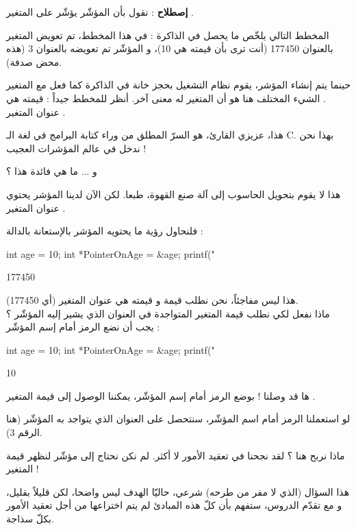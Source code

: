 \textbf{إصطلاح}
: نقول بأن المؤشّر
يؤشّر على المتغير
.

المخطط التالي يلخّص ما يحصل في الذاكرة :
في هذا المخطط، تم تعويض المتغير
بالعنوان 177450 (أنت ترى بأن قيمته هي 10)، و المؤشّر
تم تعويضه بالعنوان 3 (هذه محض صدفة).

حينما يتم إنشاء المؤشر، يقوم نظام التشغيل بحجز خانة في الذاكرة كما فعل مع المتغير
.
الشيء المختلف هنا هو أن المتغير
له معنى آخر. أنظر للمخطط جيداً : قيمته هي عنوان المتغير
.

هذا، عزيزي القارئ، هو السرّ المطلق من وراء كتابة البرامج في لغة الـ
\textenglish{C}.
بهذا نحن ندخل في عالم المؤشرات العجيب !
\begin{question}
	و ... ما هي فائدة هذا ؟
\end{question}
هذا لا يقوم بتحويل الحاسوب إلى آلة صنع القهوة، طبعا. لكن الآن لدينا المؤشر
يحتوي عنوان المتغير
.

فلنحاول رؤية ما يحتويه المؤشر بالإستعانة بالدالة
 :
\begin{Csource}
int age = 10;
int *PointerOnAge = &age;
printf("%
\end{Csource}
\begin{Console}
177450
\end{Console}
هذا ليس مفاجئاً، نحن نطلب قيمة
و قيمته هي عنوان المتغير
(أي 177450).\\
ماذا نفعل لكي نطلب قيمة المتغير المتواجدة في العنوان الذي يشير إليه المؤشّر
؟ يجب أن نضع الرمز
\InlineCode{*}
أمام إسم المؤشّر :
\begin{Csource}
int age = 10;
int *PointerOnAge = &age;
printf("%
\end{Csource}
\begin{Console}
10
\end{Console}
ها قد وصلنا ! بوضع الرمز
\InlineCode{*}
أمام إسم المؤشّر، يمكننا الوصول إلى قيمة المتغير
.

لو استعملنا الرمز
\InlineCode{\&}
أمام اسم المؤشّر، سنتحصل على العنوان الذي يتواجد به المؤشّر (هنا الرقم 3).
\begin{question}
	ماذا نربح هنا ؟ لقد نجحنا في تعقيد الأمور لا أكثر. لم نكن نحتاج إلى مؤشّر لنظهر قيمة المتغير
 !
\end{question}
هذا السؤال (الذي لا مفر من طرحه) شرعي، حاليّا الهدف ليس واضحا، لكن قليلاً بقليل، و مع تقدّم الدروس، ستفهم بأن كلّ هذه المبادئ لم يتم اختراعها من أجل تعقيد الأمور بكلّ سذاجة.

